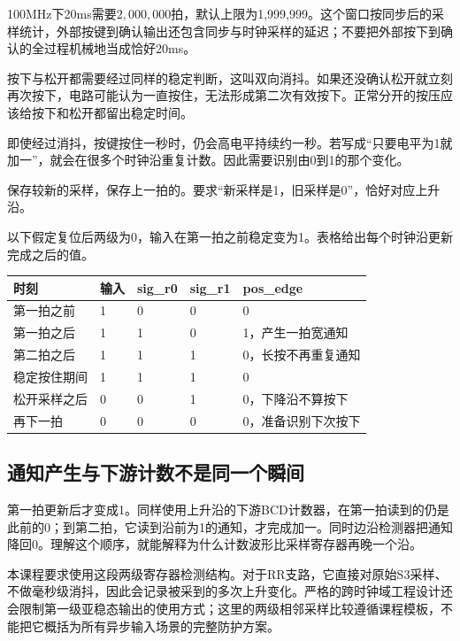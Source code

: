 100MHz下20ms需要$2,000,000$拍，默认上限为1,999,999。这个窗口按同步后的采样统计，外部按键到确认输出还包含同步与时钟采样的延迟；不要把外部按下到确认的全过程机械地当成恰好20ms。

按下与松开都需要经过同样的稳定判断，这叫双向消抖。如果还没确认松开就立刻再次按下，电路可能认为一直按住，无法形成第二次有效按下。正常分开的按压应该给按下和松开都留出稳定时间。


即使经过消抖，按键按住一秒时，仍会高电平持续约一秒。若写成“只要电平为1就加一”，就会在很多个时钟沿重复计数。因此需要识别由0到1的那个变化。

保存较新的采样，保存上一拍的。要求“新采样是1，旧采样是0”，恰好对应上升沿。

以下假定复位后两级为0，输入在第一拍之前稳定变为1。表格给出每个时钟沿更新完成之后的值。
\begin{center}
\begin{tabularx}{\linewidth}{@{}llllX@{}}\toprule
时刻 & 输入 & sig\_r0 & sig\_r1 & pos\_edge\\\midrule
第一拍之前 & 1 & 0 & 0 & 0\\
第一拍之后 & 1 & 1 & 0 & 1，产生一拍宽通知\\
第二拍之后 & 1 & 1 & 1 & 0，长按不再重复通知\\
稳定按住期间 & 1 & 1 & 1 & 0\\
松开采样之后 & 0 & 0 & 1 & 0，下降沿不算按下\\
再下一拍 & 0 & 0 & 0 & 0，准备识别下次按下\\\bottomrule
\end{tabularx}
\end{center}

\subsection{通知产生与下游计数不是同一个瞬间}
第一拍更新后才变成1。同样使用上升沿的下游BCD计数器，在第一拍读到的仍是此前的0；到第二拍，它读到沿前为1的通知，才完成加一。同时边沿检测器把通知降回0。理解这个顺序，就能解释为什么计数波形比采样寄存器再晚一个沿。

本课程要求使用这段两级寄存器检测结构。对于RR支路，它直接对原始S3采样、不做毫秒级消抖，因此会记录被采到的多次上升变化。严格的跨时钟域工程设计还会限制第一级亚稳态输出的使用方式；这里的两级相邻采样比较遵循课程模板，不能把它概括为所有异步输入场景的完整防护方案。

